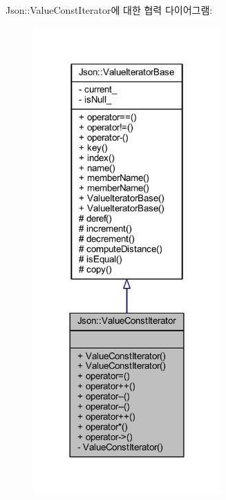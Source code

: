 Json\+:\+:Value\+Const\+Iterator에 대한 협력 다이어그램\+:\nopagebreak
\begin{figure}[H]
\begin{center}
\leavevmode
\includegraphics[width=203pt]{class_json_1_1_value_const_iterator__coll__graph}
\end{center}
\end{figure}
